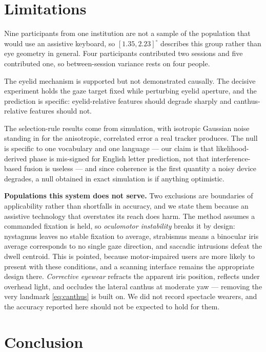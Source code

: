 \documentclass[conference]{IEEEtran}
\begin{document}
\section{Limitations}
\label{sec:limits}

Nine participants from one institution are not a sample of the population that
would use an assistive keyboard, so $[1.35, 2.23]^\circ$ describes this group
rather than eye geometry in general. Four participants contributed two sessions
and five contributed one, so between-session variance rests on four people.

The eyelid mechanism is supported but not demonstrated causally. The decisive
experiment holds the gaze target fixed while perturbing eyelid aperture, and the
prediction is specific: eyelid-relative features should degrade sharply and
canthus-relative features should not.

The selection-rule results come from simulation, with isotropic Gaussian noise
standing in for the anisotropic, correlated error a real tracker produces. The
null is specific to one vocabulary and one language --- our claim is that
likelihood-derived phase is mis-signed for English letter prediction, not that
interference-based fusion is useless --- and since coherence is the first
quantity a noisy device degrades, a null obtained in exact simulation is if
anything optimistic.

\textbf{Populations this system does not serve.} Two exclusions are boundaries
of applicability rather than shortfalls in accuracy, and we state them because
an assistive technology that overstates its reach does harm. The method assumes
a commanded fixation is held, so \emph{oculomotor instability} breaks it by
design: nystagmus leaves no stable fixation to average, strabismus means a
binocular iris average corresponds to no single gaze direction, and saccadic
intrusions defeat the dwell centroid. This is pointed, because motor-impaired
users are more likely to present with these conditions, and a scanning interface
remains the appropriate design there. \emph{Corrective eyewear} refracts the
apparent iris position, reflects under overhead light, and occludes the lateral
canthus at moderate yaw --- removing the very landmark \eqref{eq:canthus} is
built on. We did not record spectacle wearers, and the accuracy reported here
should not be expected to hold for them.

\section{Conclusion}
\end{document}
